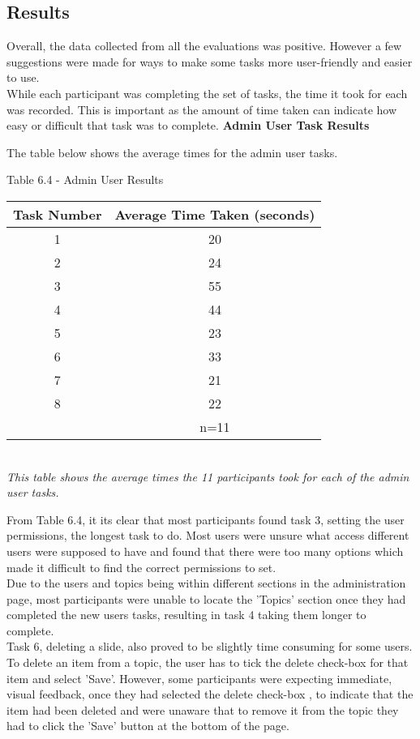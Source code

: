 \documentclass{l3proj}
\begin{document}
\subsection{Results}

Overall, the data collected from all the evaluations was positive. However a few suggestions were made for ways to make some tasks more user-friendly and easier to use.\\
While each participant was completing the set of tasks, the time it took for each was recorded. This is important as the amount of time taken can indicate how easy or difficult that task was to complete. 
\newpage
\textbf{Admin User Task Results}

The table below shows the average times for the admin user tasks.

\begin{center}
Table 6.4 - Admin User Results\\
\begin{tabular}{|c|c|}
\hline \textbf{Task Number} & \textbf{Average Time Taken (seconds)}\\
\hline
\hline 1 & 20\\
\hline 2 & 24\\
\hline 3 & 55\\
\hline 4 & 44\\
\hline 5 & 23\\
\hline 6 & 33\\
\hline 7 & 21\\
\hline 8 & 22\\
\hline & n=11\\
\hline
\end{tabular}\\
\textit{{\small This table shows the average times the 11 participants took for each of the admin user tasks.}}
\end{center}

From Table 6.4, it its clear that most participants found task 3, setting the user permissions, the longest task to do. Most users were unsure what access different users were supposed to have and found that there were too many options which made it difficult to find the correct permissions to set.\\
Due to the users and topics being within different sections in the administration page, most participants were unable to locate the 'Topics' section once they had completed the new users tasks, resulting in task 4 taking them longer to complete.\\
Task 6, deleting a slide,  also proved to be slightly time consuming for some users. To delete an item from a topic, the user has to tick the delete check-box for that item and select 'Save'. However, some participants were expecting immediate, visual feedback, once they had selected the delete check-box , to indicate that the item had been deleted and were unaware that to remove it from the topic they had to click the 'Save' button at the bottom of the page.\\
\end{document}
